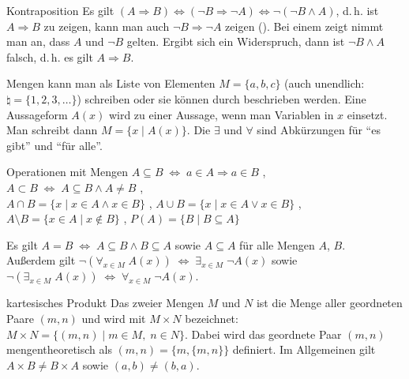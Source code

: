 \begin{Def}{Kontraposition}
    Es gilt $(A \Rightarrow B) \Leftrightarrow (\lnot B \Rightarrow \lnot A)
    \Leftrightarrow \lnot(\lnot B \land A)$, d.\,h. ist $A \Rightarrow B$ zu
    zeigen, kann man auch $\lnot B \Rightarrow \lnot A$ zeigen
    ().
    Bei einem  zeigt nimmt man an, dass $A$ und
    $\lnot B$ gelten.
    Ergibt sich ein Widerspruch, dann ist $\lnot B \land A$ falsch, d.\,h.
    es gilt $A \Rightarrow B$.
\end{Def}

\begin{Notation}
    Mengen kann man als Liste von Elementen $M = \{a, b, c\}$
    (auch unendlich: $\natural = \{1, 2, 3, \ldots\}$) schreiben oder sie
    können durch  beschrieben werden.
    Eine Aussageform $A(x)$ wird zu einer Aussage, wenn man Variablen in $x$
    einsetzt.
    Man schreibt dann $M = \{x \;|\; A(x)\}$.
    Die  $\exists$ und $\forall$ sind Abkürzungen für
    "`es gibt"' und "`für alle"'.
\end{Notation}

\begin{Def}{Operationen mit Mengen}
    $A \subseteq B \;\Leftrightarrow\; a \in A \Rightarrow a \in B$
    , \\
    $A \subset B \;\Leftrightarrow\; A \subseteq B \land A \not= B$
    , \\
    $A \cap B = \{x \;|\; x \in A \land x \in B\}$ ,
    $A \cup B = \{x \;|\; x \in A \lor x \in B\}$ ,
    $A \setminus B = \{x \in A \;|\; x \notin B\}$ ,
    $P(A) = \{B \;|\; B \subseteq A\}$ 
\end{Def}

\begin{Bem}
    Es gilt $A = B \;\Leftrightarrow\; A \subseteq B \land B \subseteq A$
    sowie $A \subseteq A$ für alle Mengen $A$, $B$. \\
    Außerdem gilt $\lnot(\forall_{x \in M}\; A(x)) \;\Leftrightarrow\;
    \exists_{x \in M}\; \lnot A(x)$ sowie
    $\lnot(\exists_{x \in M}\; A(x)) \;\Leftrightarrow\;
    \forall_{x \in M}\; \lnot A(x)$.
\end{Bem}

\begin{Def}{kartesisches Produkt}
    Das  zweier Mengen $M$ und $N$ ist die Menge
    aller geordneten Paare $(m, n)$ und wird mit $M \times N$ bezeichnet: \\
    $M \times N = \{(m, n) \;|\; m \in M,\; n \in N\}$.
    Dabei wird das geordnete Paar $(m, n)$ mengentheoretisch als
    $(m, n) = \{m, \{m, n\}\}$ definiert.
    Im Allgemeinen gilt $A \times B \not= B \times A$
    sowie $(a, b) \not= (b, a)$.
\end{Def}

